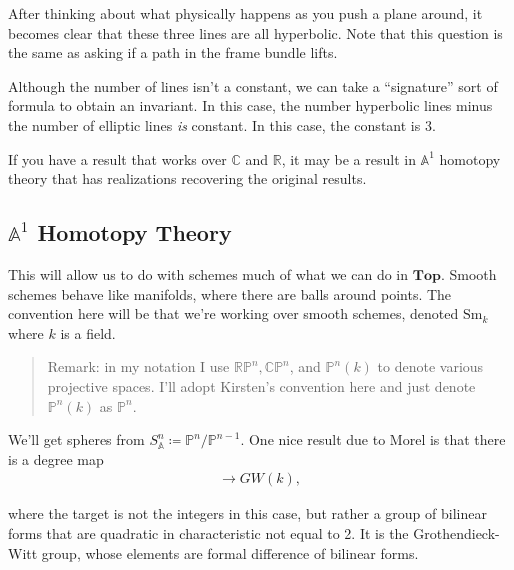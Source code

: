 After thinking about what physically happens as you push a plane around,
it becomes clear that these three lines are all hyperbolic. Note that
this question is the same as asking if a path in the frame bundle lifts.

Although the number of lines isn't a constant, we can take a
``signature'' sort of formula to obtain an invariant. In this case, the
number hyperbolic lines minus the number of elliptic lines \emph{is}
constant. In this case, the constant is 3.

\begin{slogan}

If you have a result that works over \({\mathbb{C}}\) and
\({\mathbb{R}}\), it may be a result in \({\mathbb{A}}^1\) homotopy
theory that has realizations recovering the original results.

\end{slogan}

\hypertarget{mathbba1-homotopy-theory}{%
\subsection{\texorpdfstring{\({\mathbb{A}}^1\) Homotopy
Theory}{\{\textbackslash mathbb\{A\}\}\^{}1 Homotopy Theory}}\label{mathbba1-homotopy-theory}}

This will allow us to do with schemes much of what we can do in
\(\mathbf{Top}\). Smooth schemes behave like manifolds, where there are
balls around points. The convention here will be that we're working over
smooth schemes, denoted \(\mathrm{Sm}_k\) where \(k\) is a field.

\begin{quote}
Remark: in my notation I use \({\mathbb{RP}}^n, {\mathbb{CP}}^n\), and
\({\mathbb{P}}^n(k)\) to denote various projective spaces. I'll adopt
Kirsten's convention here and just denote \({\mathbb{P}}^n(k)\) as
\({\mathbb{P}}^n\).
\end{quote}

We'll get spheres from
\(S_{\mathbb{A}}^n \coloneqq{\mathbb{P}}^n/{\mathbb{P}}^{n-1}\). One
nice result due to Morel is that there is a degree map
\begin{align*}
[S_{\mathbb{A}}^n, S_{\mathbb{A}}^n] \to GW(k),
\end{align*}

where the target is not the integers in this case, but rather a group of
bilinear forms that are quadratic in characteristic not equal to 2. It
is the Grothendieck-Witt group, whose elements are formal difference of
bilinear forms.

